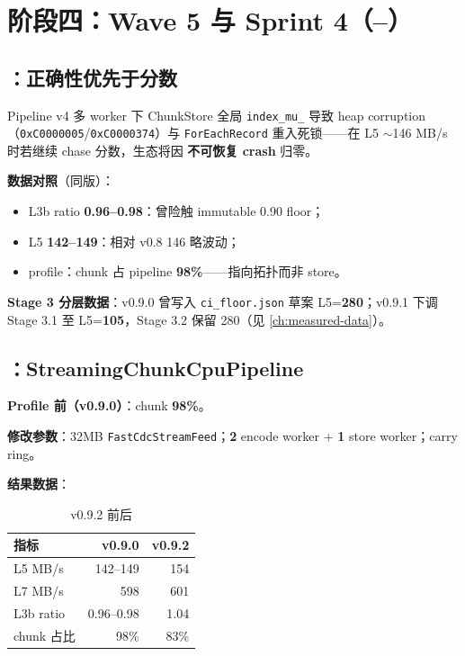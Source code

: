 \chapter{阶段四：Wave 5 与 Sprint 4（--）}
\label{ch:phase-streaming}

\section{：正确性优先于分数}

\begin{pressbox}[P3 爆发]
Pipeline v4 多 worker 下 ChunkStore 全局 \texttt{index\_mu\_} 导致 heap corruption（\texttt{0xC0000005}/\texttt{0xC0000374}）与 \texttt{ForEachRecord} 重入死锁——在 L5 $\sim$146 MB/s 时若继续 chase 分数，生态将因 \textbf{不可恢复 crash} 归零。
\end{pressbox}

\textbf{数据对照}（同版）：
\begin{itemize}[nosep]
  \item L3b ratio \textbf{0.96--0.98}：曾险触 immutable 0.90 floor；
  \item L5 \textbf{142--149}：相对 v0.8 146 略波动；
  \item profile：chunk 占 pipeline \textbf{98\%}——指向拓扑而非 store。
\end{itemize}

\textbf{Stage 3 分层数据}：v0.9.0 曾写入 \texttt{ci\_floor.json} 草案 L5=\textbf{280}；v0.9.1 下调 Stage 3.1 至 L5=\textbf{105}，Stage 3.2 保留 280（见 \cref{ch:measured-data}）。

\section{：StreamingChunkCpuPipeline}

\textbf{Profile 前（v0.9.0）}：chunk \textbf{98\%}。

\textbf{修改参数}：32MB \texttt{FastCdcStreamFeed}；\textbf{2} encode worker + \textbf{1} store worker；carry ring。

\textbf{结果数据}：
\begin{table}[htbp]
\centering
\caption{v0.9.2 前后}
\begin{tabular}{@{}lrr@{}}
\toprule
指标 & v0.9.0 & v0.9.2 \\
\midrule
L5 MB/s & 142--149 & 154 \\
L7 MB/s & 598 & 601 \\
L3b ratio & 0.96--0.98 & 1.04 \\
chunk 占比 & 98\% & 83\% \\
\bottomrule
\end{tabular}
\end{table}

